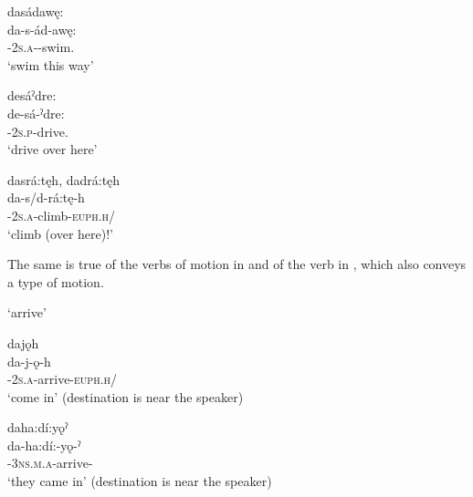 \ex dasádawę:\\
\gll da-s-ád-awę:\\
{\cislocative}-\textsc{2s.a}-{\semireflexive}-swim.{\noaspect}\\
\glt `swim this way'

\newpage
\ex desáˀdre:\\
\gll de-sá-ˀdre:\\
{\cislocative}-\textsc{2s.p}-drive.{\noaspect}\\
\glt `drive over here'

\ex dasrá:tęh, dadrá:tęh \\
\gll da-s/d-rá:tę-h\\
\textsc{\cislocative-2s.a}-climb-\textsc{euph.h}/{\noaspect}\\
\glt ‘climb (over here)!’  
\z
\z

The same is true of the verbs of motion in  and of the verb in , which also conveys a type of motion.

\ea\label{ex:dhex4}  ‘arrive’

\ea dajǫh\\
\gll da-j-ǫ-h\\
{\cislocative}-\textsc{2s.a}-arrive-\textsc{euph.h}/{\noaspect}\\
\glt `come in' (destination is near the speaker)

\ex daha:dí:yǫˀ\\
\gll da-ha:dí:-yǫ-ˀ\\
{\cislocative}-\textsc{3ns.m.a}-arrive-{\punctual} \\
\glt `they came in' (destination is near the speaker)
\z
\z


